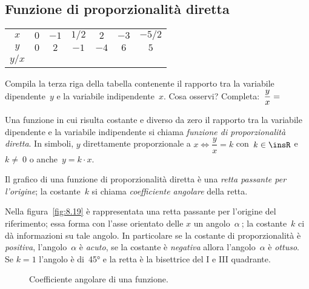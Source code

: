 \vspazio\ovalbox{\risolvii \ref{ese:8.39}, \ref{ese:8.40}}

\subsection{Funzione di proporzionalità diretta}
\begin{center}
 \begin{tabular}{ccccccc}
 \toprule
 $x$ & $0$ & $-1$ & $ 1/2$ & $2$ & $-3$ & $-5/2$\\
 $y$ & $0$ & $2$ & $-1$ & $-4$ & $6$ & $5$\\
 \midrule
 $y/x$ & & & & & & \\
 \bottomrule
 \end{tabular}
\end{center}
Compila la terza riga della tabella contenente il rapporto tra la variabile dipendente~$y$ e la variabile indipendente~$x$.
Cosa osservi? Completa:~$\dfrac{y}{x}=\dotfill$
\begin{definizione}
 Una funzione in cui risulta costante e diverso da zero il rapporto tra la variabile dipendente e la variabile indipendente
 si chiama \emph{funzione di proporzionalità diretta}. In simboli, $y$ direttamente proporzionale a
$x \Leftrightarrow \dfrac{y}{x}=k$ con~$k\in \insR$ e~$k\neq~0$ o anche~$y=k\cdot x$.
\end{definizione}
Il grafico di una funzione di proporzionalità diretta è una \emph{retta passante per l'origine};
la costante~$k$ si chiama \emph{coefficiente angolare} della retta.

Nella figura~\ref{fig:8.19} è rappresentata una retta passante per l'origine del riferimento; essa forma con l'asse orientato delle
$x$ un angolo~$\alpha~$; la costante~$k$ ci dà informazioni su tale angolo.
In particolare se la costante di proporzionalità è \emph{positiva}, l'angolo~$\alpha$ è \emph{acuto}, se la costante è
\emph{negativa} allora l'angolo~$\alpha$ è \emph{ottuso}. Se $k=1$ l'angolo è di~45° e la retta è la bisettrice del I e III quadrante.

\begin{figure}[hb]
 \begin{minipage}[t]{.45\textwidth}
  \centering
  \caption{Coefficiente angolare di una funzione.}\label{fig:8.19}
 \end{minipage}\hfil
 \begin{minipage}[t]{.45\textwidth}
  \centering
  \caption{}\label{fig:8.20}
 \end{minipage}
\end{figure}


